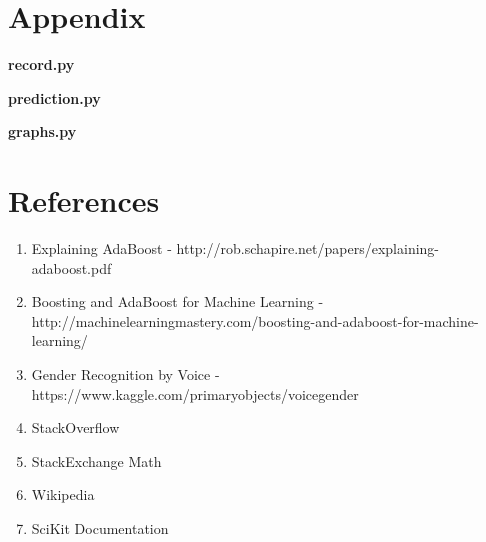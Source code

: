 \documentclass[12pt]{article}
\begin{document}
	\section{Appendix}
	\begin{center}
		\textbf{\large record.py}
	\end{center}
	
	\pagebreak
	\begin{center}
		\textbf{\large prediction.py}
	\end{center}
	
	\pagebreak
	\begin{center}
		\textbf{\large graphs.py}
	\end{center}
	
	\pagebreak
	\section{References}
	\begin{enumerate}
		\item Explaining AdaBoost - http://rob.schapire.net/papers/explaining-adaboost.pdf
		\item Boosting and AdaBoost for Machine Learning - http://machinelearningmastery.com/boosting-and-adaboost-for-machine-learning/
		\item Gender Recognition by Voice - https://www.kaggle.com/primaryobjects/voicegender
		\item StackOverflow
		\item StackExchange Math
		\item Wikipedia
		\item SciKit Documentation
	\end{enumerate}
\end{document}
